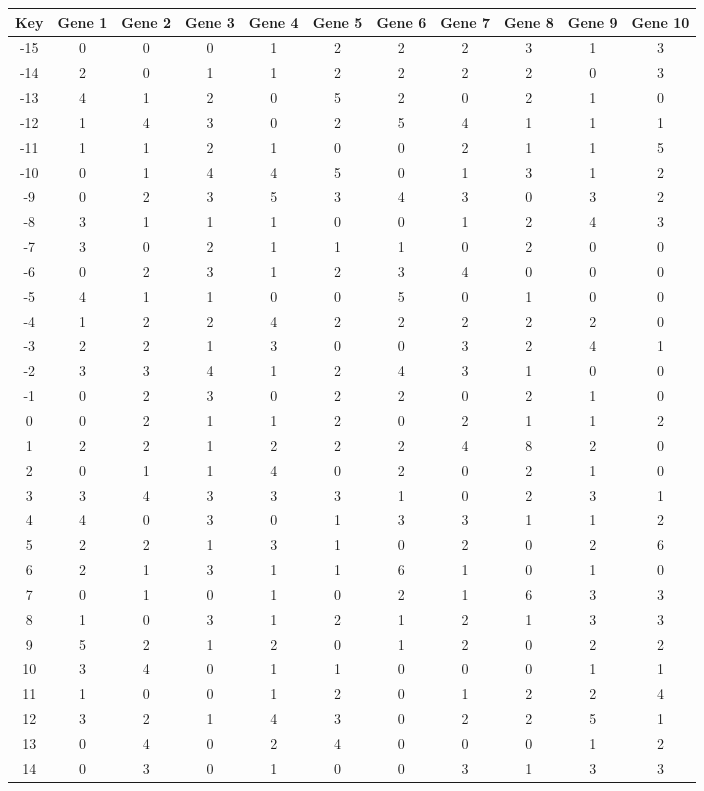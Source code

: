 \begin{tabular}{|c|c|c|c|c|c|c|c|c|c|c|}
\hline
Key & Gene 1 & Gene 2 & Gene 3 & Gene 4 & Gene 5 & Gene 6 & Gene 7 & Gene 8 & Gene 9 & Gene 10 \\
\hline
-15 & 0 & 0 & 0 & 1 & 2 & 2 & 2 & 3 & 1 & 3 \\
-14 & 2 & 0 & 1 & 1 & 2 & 2 & 2 & 2 & 0 & 3 \\
-13 & 4 & 1 & 2 & 0 & 5 & 2 & 0 & 2 & 1 & 0 \\
-12 & 1 & 4 & 3 & 0 & 2 & 5 & 4 & 1 & 1 & 1 \\
-11 & 1 & 1 & 2 & 1 & 0 & 0 & 2 & 1 & 1 & 5 \\
-10 & 0 & 1 & 4 & 4 & 5 & 0 & 1 & 3 & 1 & 2 \\
-9 & 0 & 2 & 3 & 5 & 3 & 4 & 3 & 0 & 3 & 2 \\
-8 & 3 & 1 & 1 & 1 & 0 & 0 & 1 & 2 & 4 & 3 \\
-7 & 3 & 0 & 2 & 1 & 1 & 1 & 0 & 2 & 0 & 0 \\
-6 & 0 & 2 & 3 & 1 & 2 & 3 & 4 & 0 & 0 & 0 \\
-5 & 4 & 1 & 1 & 0 & 0 & 5 & 0 & 1 & 0 & 0 \\
-4 & 1 & 2 & 2 & 4 & 2 & 2 & 2 & 2 & 2 & 0 \\
-3 & 2 & 2 & 1 & 3 & 0 & 0 & 3 & 2 & 4 & 1 \\
-2 & 3 & 3 & 4 & 1 & 2 & 4 & 3 & 1 & 0 & 0 \\
-1 & 0 & 2 & 3 & 0 & 2 & 2 & 0 & 2 & 1 & 0 \\
0 & 0 & 2 & 1 & 1 & 2 & 0 & 2 & 1 & 1 & 2 \\
1 & 2 & 2 & 1 & 2 & 2 & 2 & 4 & 8 & 2 & 0 \\
2 & 0 & 1 & 1 & 4 & 0 & 2 & 0 & 2 & 1 & 0 \\
3 & 3 & 4 & 3 & 3 & 3 & 1 & 0 & 2 & 3 & 1 \\
4 & 4 & 0 & 3 & 0 & 1 & 3 & 3 & 1 & 1 & 2 \\
5 & 2 & 2 & 1 & 3 & 1 & 0 & 2 & 0 & 2 & 6 \\
6 & 2 & 1 & 3 & 1 & 1 & 6 & 1 & 0 & 1 & 0 \\
7 & 0 & 1 & 0 & 1 & 0 & 2 & 1 & 6 & 3 & 3 \\
8 & 1 & 0 & 3 & 1 & 2 & 1 & 2 & 1 & 3 & 3 \\
9 & 5 & 2 & 1 & 2 & 0 & 1 & 2 & 0 & 2 & 2 \\
10 & 3 & 4 & 0 & 1 & 1 & 0 & 0 & 0 & 1 & 1 \\
11 & 1 & 0 & 0 & 1 & 2 & 0 & 1 & 2 & 2 & 4 \\
12 & 3 & 2 & 1 & 4 & 3 & 0 & 2 & 2 & 5 & 1 \\
13 & 0 & 4 & 0 & 2 & 4 & 0 & 0 & 0 & 1 & 2 \\
14 & 0 & 3 & 0 & 1 & 0 & 0 & 3 & 1 & 3 & 3 \\
\hline
\end{tabular}